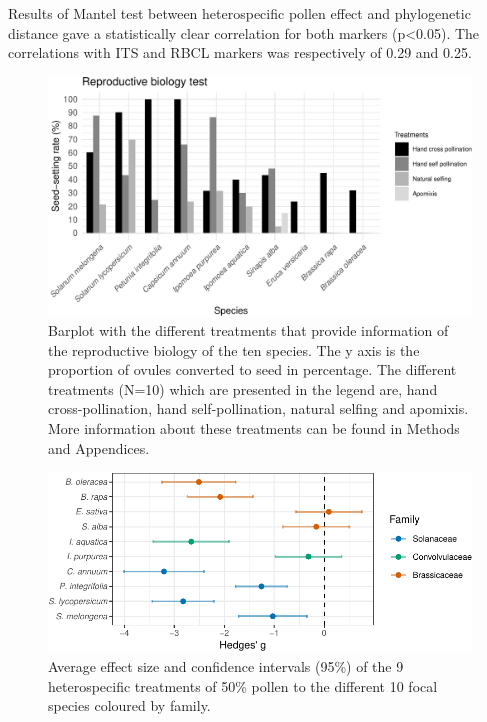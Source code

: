 \documentclass[11pt,a4paper]{article}
\begin{document}
Results of Mantel test between heterospecific pollen effect and
phylogenetic distance gave a statistically clear correlation for both
markers (p\textless{}0.05). The correlations with ITS and RBCL markers
was respectively of 0.29 and 0.25.

\newpage

\begin{figure}

{\centering \includegraphics{output/figures/unnamed-chunk-3-1} 

}

\caption{Barplot with the different treatments that provide information of the reproductive biology of the ten species. The y axis is the proportion of ovules converted to seed in percentage. The different treatments (N=10) which are presented in the legend are, hand cross-pollination, hand self-pollination, natural selfing and apomixis. More information about these treatments can be found in Methods and Appendices.}\label{fig:unnamed-chunk-3}
\end{figure}

\newpage

\begin{figure}
\centering
\includegraphics{output/figures/unnamed-chunk-4-1.pdf}
\caption{Average effect size and confidence intervals (95\%) of the 9
heterospecific treatments of 50\% pollen to the different 10 focal
species coloured by family.}
\end{figure}
\end{document}
